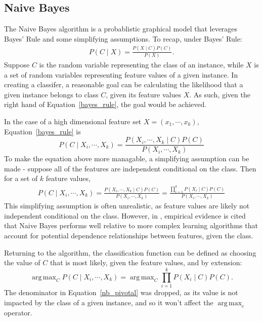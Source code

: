 \documentclass{amsart}
\DeclareMathOperator*{\argmax}{arg\,max}
\begin{document}
    \subsection*{Naive Bayes}
    The Naive Bayes algorithm\cite{naivebayes} is a probablistic graphical model that leverages Bayes' Rule and some simplifying
    assumptions. To recap, under Bayes' Rule:
    \begin{align}
        P(C \mid X) = \frac{P(X \mid C) P(C)}{P(X)}.
    \label{bayes_rule}
    \end{align}
    Suppose $C $ is the random variable representing the class of an instance, while $X$ is a
    set of random variables representing feature values of a given instance. In creating a classifer,
    a reasonable goal can be calculating the
    likelihood that a given instance belongs to class $C$, given its feature values $X$.
    As such, given the right hand of Equation~\ref{bayes_rule}, the goal would be achieved.

    In the case of a high dimensional feature set $X = (x_1, \cdots, x_k)$, Equation~\ref{bayes_rule}
    is
    \[
    P(C \mid X_i, \cdots, X_k ) = \frac{
                P(X_i, \cdots, X_k\mid C) P(C)
            }{P(X_i, \cdots, X_k)}
    \]
    To make the equation above more managable, a simplifying assumption can be made - suppose all
    of the features are independent conditional on the class. Then for a set
    of $k$ feature values,
    \begin{align}
        P(C \mid X_i, \cdots, X_k ) = \frac{
            P(X_i, \cdots, X_k\mid C) P(C)
        }{P(X_i, \cdots, X_k)}
        = \frac{
            \prod_{i=1}^k P(X_i \mid C) P(C)
        }{P(X_i, \cdots, X_k)}
    \label{nb_pivotal}
    \end{align}
    This simplifying assumption is often unrealistic, as feature values are likely not independent conditional on the class.
    However, in \cite{naivebayes}, empirical evidence is cited that Naive Bayes performs well relative
    to more complex learning algorithms that account for potential dependence relationships between features, given the class.

    Returning to the algorithm, the classification function can be defined as choosing the value of $C$ that is most likely, given
    the feature values, and by extension:
    \[
        \argmax_C P(C \mid X_i, \cdots, X_k) = \argmax_C \prod_{i=1}^k P(X_i \mid C) P(C).
    \]
    The denominator in Equation~\ref{nb_pivotal} was dropped, as its value is not impacted by the class
    of a given instance, and so it won't affect the $\argmax_c$ operator.
\end{document}
